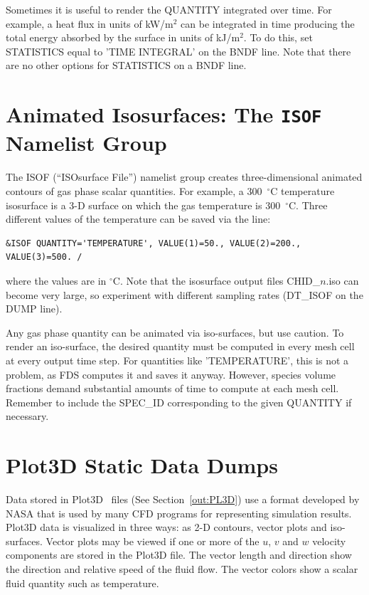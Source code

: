 \documentclass[11pt]{book}
\begin{document}
Sometimes it is useful to render the {\ct QUANTITY} integrated over time. For example, a heat flux in units of kW/m$^2$ can be integrated in time producing the total energy absorbed by the surface in units of kJ/m$^2$. To do this, set {\ct STATISTICS} equal to {\ct 'TIME INTEGRAL'} on the {\ct BNDF} line. Note that there are no other options for {\ct STATISTICS} on a {\ct BNDF} line.



\section{Animated Isosurfaces: The \texorpdfstring{{\tt ISOF}}{ISOF} Namelist Group}
\label{info:ISOF}

The {\ct ISOF} (``ISOsurface File'') namelist group creates three-dimensional animated contours of gas phase scalar quantities. For example, a 300~$^\circ$C temperature isosurface is a 3-D surface on which the gas temperature is 300~$^\circ$C. Three different values of the temperature can be saved via the line:
\begin{lstlisting}
&ISOF QUANTITY='TEMPERATURE', VALUE(1)=50., VALUE(2)=200., VALUE(3)=500. /
\end{lstlisting}
where the values are in $^\circ$C. Note that the isosurface output files {\ct CHID\_$n$.iso} can become very large, so experiment with different sampling rates ({\ct DT\_ISOF} on the {\ct DUMP} line).

Any gas phase quantity can be animated via iso-surfaces, but use caution. To render an iso-surface, the desired quantity must be computed in every mesh cell at every output time step. For quantities like {\ct 'TEMPERATURE'}, this is not a problem, as FDS computes it and saves it anyway. However, species volume fractions demand substantial amounts of time to compute at each mesh cell. Remember to include the {\ct SPEC\_ID} corresponding to the given {\ct QUANTITY} if necessary.




\section{Plot3D Static Data Dumps}
\label{info:PL3D}

Data stored in Plot3D~\cite{PLOT3D} files (See Section~\ref{out:PL3D}) use a format developed by NASA that is used by many CFD programs for representing simulation results. Plot3D data is visualized in three ways: as 2-D contours, vector plots and iso-surfaces. Vector plots may be viewed if one or more of the $u$, $v$ and $w$ velocity components are stored in the Plot3D file. The vector length and direction show the direction and relative speed of the fluid flow. The vector colors show a scalar fluid quantity such as temperature.
\end{document}
